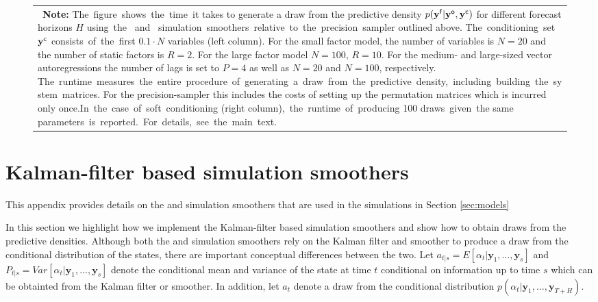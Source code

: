\documentclass[notitlepage,a4paper,12pt]{article}
\begin{document}
\begin{ThreePartTable}
\begin{figure}[htbp]
\begin{tabular}{p{16cm}}
{    \footnotesize \textbf{Note:} The figure shows the time it takes to generate a draw from the predictive density $p(\mathbf{y^{\sf{f}}}|\mathbf{y^{\sf{o}}}, \mathbf{y^{\sf{c}}})$ for different forecast horizons $H$ using the \citet{carterkohn1994_biomtr} and \citet{durbinkoopman2002_biomtr} simulation smoothers relative to the precision sampler outlined above. The conditioning set $\mathbf{y}^{\sf{c}}$ consists of the first $0.1\cdot N$ variables (left column). For the small factor model, the number of variables is $N=20$ and the number of static factors is $R=2$. For the large factor model $N=100,\, R = 10$. For the medium- and large-sized vector autoregressions the number of lags is set to $P=4$ as well as $N=20$ and $N=100$, respectively. The runtime measures the entire procedure of generating a draw from the predictive density, including building the system matrices. For the precision-sampler this includes the costs of setting up the permutation matrices which is incurred only once.In the case of soft conditioning (right column), the runtime of producing 100 draws given the same parameters is reported. For details, see the main text.
    }
    \end{tabular}
    \newline
    \normalsize
\end{figure}

\pagebreak
\newpage

\section{Kalman-filter based simulation smoothers}\label{app:kalmansimsmoothers}

This appendix provides details on the \citet{carterkohn1994_biomtr} and \citet{durbinkoopman2002_biomtr} simulation smoothers that are used in the simulations in Section \ref{sec:models}

In this section we highlight how we implement the Kalman-filter based simulation smoothers and show how to obtain draws from the predictive densities. Although both the \citet{carterkohn1994_biomtr} and \citet{durbinkoopman2002_biomtr} simulation smoothers rely on the Kalman filter and smoother to produce a draw from the conditional distribution of the states, there are important conceptual differences between the two. Let $a_{t|s} = E[\alpha_t|\mathbf{y}_1, \dots, \mathbf{y}_s]$ and $P_{t|s} = Var[\alpha_t|\mathbf{y}_1, \dots, \mathbf{y}_s]$ denote the conditional mean and variance of the state at time $t$ conditional on information up to time $s$ which can be obtainted from the Kalman filter or smoother. In addition, let $a_t$ denote a draw from the conditional distribution $p(\alpha_t | \mathbf{y}_1, \dots, \mathbf{y}_{T+H})$. 


\end{ThreePartTable}
\end{document}
